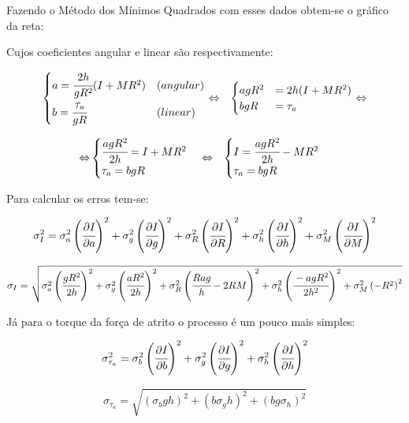 \documentclass{article}
\begin{document}
Fazendo o Método dos Mínimos Quadrados com esses dados obtem-se o
gráfico da reta:

Cujos coeficientes angular e linear são respectivamente:

\begin{eqnarray*}
\begin{cases}
a=\cfrac{2h}{gR^{2}}(I+MR^{2}) & (angular)\\
b=\cfrac{\tau_{a}}{gR} & (linear)
\end{cases} & \Leftrightarrow & \begin{cases}
agR^{2} & =2h(I+MR^{2})\\
bgR & =\tau_{a}
\end{cases}\Leftrightarrow
\end{eqnarray*}


\begin{eqnarray*}
\Leftrightarrow & \begin{cases}
\cfrac[r]{agR^{2}}{2h}=I+MR^{2}\\
\tau_{a}=bgR
\end{cases}\Leftrightarrow & \begin{cases}
I=\cfrac[r]{agR^{2}}{2h}-MR^{2}\\
\tau_{a}=bgR
\end{cases}
\end{eqnarray*}


Para calcular os erros tem-se:

\[
\sigma_{I}^{2}=\sigma_{a}^{2}\left(\cfrac[r]{\partial I}{\partial a}\right)^{2}+\sigma_{g}^{2}\left(\cfrac[r]{\partial I}{\partial g}\right)^{2}+\sigma_{R}^{2}\left(\cfrac{\partial I}{\partial R}\right)^{2}+\sigma_{h}^{2}\left(\cfrac[r]{\partial I}{\partial h}\right)^{2}+\sigma_{M}^{2}\left(\cfrac{\partial I}{\partial M}\right)^{2}
\]


\[
\sigma_{I}=\sqrt{\sigma_{a}^{2}\left(\cfrac[r]{gR^{2}}{2h}\right)^{2}+\sigma_{g}^{2}\left(\cfrac[r]{aR^{2}}{2h}\right)^{2}+\sigma_{R}^{2}\left(\cfrac{Rag}{h}-2RM\right)^{2}+\sigma_{h}^{2}\left(\cfrac[r]{-agR^{2}}{2h^{2}}\right)^{2}+\sigma_{M}^{2}\left(-R^{2}\right)^{2}}
\]


Já para o torque da força de atrito o processo é um pouco mais simples:

\[
\sigma_{\tau_{a}}^{2}=\sigma_{b}^{2}\left(\cfrac[r]{\partial I}{\partial b}\right)^{2}+\sigma_{g}^{2}\left(\cfrac[r]{\partial I}{\partial g}\right)^{2}+\sigma_{h}^{2}\left(\cfrac[r]{\partial I}{\partial h}\right)^{2}
\]


\[
\sigma_{\tau_{a}}=\sqrt{(\sigma_{b}gh)^{2}+(b\sigma_{g}h)^{2}+(bg\sigma_{h})^{2}}
\]
\end{document}

